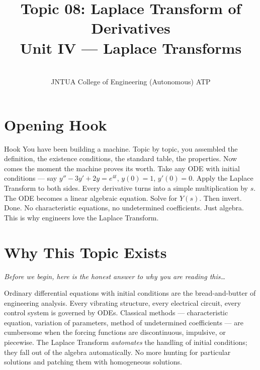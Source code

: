 \documentclass[12pt,a4paper]{article}
\title{Topic 08: Laplace Transform of Derivatives \\
       \large Unit IV --- Laplace Transforms}
\author{ \\
        JNTUA College of Engineering (Autonomous) ATP}
\date{}
\begin{document}
\maketitle
\tableofcontents
\newpage

\section{Opening Hook}

\begin{curiositybox}{Hook}
You have been building a machine. Topic by topic, you assembled the
definition, the existence conditions, the standard table, the properties.
Now comes the moment the machine proves its worth. Take any ODE with
initial conditions --- say $y'' - 3y' + 2y = e^{4t}$, $y(0)=1$,
$y'(0)=0$. Apply the Laplace Transform to both sides. Every derivative
turns into a simple multiplication by $s$. The ODE becomes a linear
algebraic equation. Solve for $Y(s)$. Then invert. Done. No
characteristic equations, no undetermined coefficients. Just algebra.
This is why engineers love the Laplace Transform.
\end{curiositybox}

\section{Why This Topic Exists}

\textit{Before we begin, here is the honest answer to why you are reading
this\ldots}

Ordinary differential equations with initial conditions are the
bread-and-butter of engineering analysis. Every vibrating structure, every
electrical circuit, every control system is governed by ODEs. Classical
methods --- characteristic equation, variation of parameters, method of
undetermined coefficients --- are cumbersome when the forcing functions
are discontinuous, impulsive, or piecewise. The Laplace Transform
\emph{automates} the handling of initial conditions; they fall out of
the algebra automatically. No more hunting for particular solutions and
patching them with homogeneous solutions.
\end{document}
